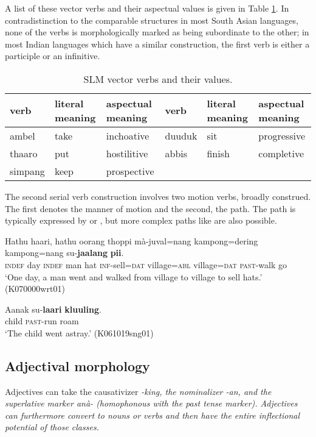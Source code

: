 A list of these vector verbs and their aspectual values is given in Table \ref{tab:vectorverbs}. In contradistinction to the comparable structures in most South Asian languages, none of the verbs is morphologically marked as being subordinate to the other; in most Indian languages which have a similar construction, the first verb is either a participle or an infinitive.

\begin{table}
    \centering
 \begin{tabular}{lll|lll}
 verb   & literal \newline meaning & aspectual \newline meaning    & verb & literal \newline meaning      &  aspectual \newline meaning  \\
\hline
 ambel   & take & inchoative  & duuduk & sit    &  progressive\\
 thaaro  & put  & hostilitive &  abbis & finish &  completive\\
 simpang & keep & prospective  \\       
 \end{tabular}
\caption{SLM vector verbs and their values.}
\label{tab:vectorverbs}
\end{table}

The second serial verb construction involves two motion verbs, broadly construed. The first denotes the manner of motion and the second, the path. The path is typically expressed by  or , but more complex paths like  are also possible.


\ea\label{ex:constr:pred:v:svc:pii}
\gll Hathu haari, hathu oorang thoppi mà-juval=nang kampong=dering kampong=nang su-\textbf{jaalang} \textbf{pii}. \\
     \textsc{indef} day \textsc{indef} man hat \textsc{inf}-sell=\textsc{dat} village=\textsc{abl} village=\textsc{dat} \textsc{past}-walk go  \\
    `One day, a man went and walked from village to village to sell hats.'  (K070000wrt01)
\z      



\ea\label{ex:constr:pred:v:svc:kluuling}
\gll Aanak su-\textbf{laari} \textbf{kluuling}. \\
       child \textsc{past}-run roam\\
    `The child went astray.' (K061019sng01)
\z


\subsection{Adjectival morphology}
Adjectives can take the causativizer \em -king\em, the nominalizer \em -an\em, and the superlative marker \em anà- \em (homophonous with the past tense marker). Adjectives can furthermore convert to nouns or verbs and then have the entire inflectional potential of those classes.

